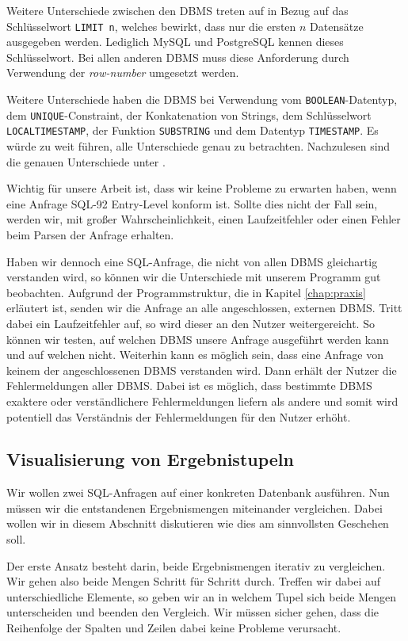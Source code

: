 Weitere Unterschiede zwischen den DBMS treten auf in Bezug auf das Schlüsselwort \verb|LIMIT n|, welches bewirkt, dass nur die ersten $n$ Datensätze ausgegeben werden. Lediglich MySQL und PostgreSQL kennen dieses Schlüsselwort. Bei allen anderen DBMS muss diese Anforderung durch Verwendung der \textit{row-number} umgesetzt werden. 

Weitere Unterschiede haben die DBMS bei Verwendung vom \verb|BOOLEAN|-Datentyp, dem \verb|UNIQUE|-Constraint, der Konkatenation von Strings, dem Schlüsselwort \verb|LOCALTIMESTAMP|, der Funktion \verb|SUBSTRING| und dem Datentyp \verb|TIMESTAMP|. Es würde zu weit führen, alle Unterschiede genau zu betrachten. Nachzulesen sind die genauen Unterschiede unter \cite{sqldiff1}.

Wichtig für unsere Arbeit ist, dass wir keine Probleme zu erwarten haben, wenn eine Anfrage SQL-92 Entry-Level konform ist. Sollte dies nicht der Fall sein, werden wir, mit großer Wahrscheinlichkeit, einen Laufzeitfehler oder einen Fehler beim Parsen der Anfrage erhalten.

Haben wir dennoch eine SQL-Anfrage, die nicht von allen DBMS gleichartig verstanden wird, so können wir die Unterschiede mit unserem Programm gut beobachten. Aufgrund der Programmstruktur, die in Kapitel \ref{chap:praxis} erläutert ist, senden wir die Anfrage an alle angeschlossen, externen DBMS. Tritt dabei ein Laufzeitfehler auf, so wird dieser an den Nutzer weitergereicht. So können wir testen, auf welchen DBMS unsere Anfrage ausgeführt werden kann und auf welchen nicht. Weiterhin kann es möglich sein, dass eine Anfrage von keinem der angeschlossenen DBMS verstanden wird. Dann erhält der Nutzer die Fehlermeldungen aller DBMS. Dabei ist es möglich, dass bestimmte DBMS exaktere oder verständlichere Fehlermeldungen liefern als andere und somit wird potentiell das Verständnis der Fehlermeldungen für den Nutzer erhöht.

\subsection{Visualisierung von Ergebnistupeln}

Wir wollen zwei SQL-Anfragen auf einer konkreten Datenbank ausführen. Nun müssen wir die entstandenen Ergebnismengen miteinander vergleichen. Dabei wollen wir in diesem Abschnitt diskutieren wie dies am sinnvollsten Geschehen soll. 

Der erste Ansatz besteht darin, beide Ergebnismengen iterativ zu vergleichen. Wir gehen also beide Mengen Schritt für Schritt durch. Treffen wir dabei auf unterschiedliche Elemente, so geben wir an in welchem Tupel sich beide Mengen unterscheiden und beenden den Vergleich. Wir müssen sicher gehen, dass die Reihenfolge der Spalten und Zeilen dabei keine Probleme verursacht.

